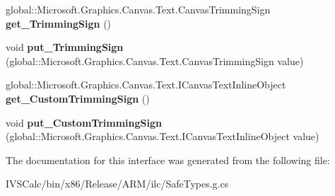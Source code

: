 \begin{DoxyCompactItemize}
\mbox{\label{interface_microsoft_1_1_graphics_1_1_canvas_1_1_text_1_1_i_canvas_text_format_a470488d4549d1bc276b39772375c8064}} 
global\+::\+Microsoft.\+Graphics.\+Canvas.\+Text.\+Canvas\+Trimming\+Sign {\bfseries get\+\_\+\+Trimming\+Sign} ()
\item 
\mbox{\label{interface_microsoft_1_1_graphics_1_1_canvas_1_1_text_1_1_i_canvas_text_format_ac8017ec2b958d4f84c22ffd8b24319e5}} 
void {\bfseries put\+\_\+\+Trimming\+Sign} (global\+::\+Microsoft.\+Graphics.\+Canvas.\+Text.\+Canvas\+Trimming\+Sign value)
\item 
\mbox{\label{interface_microsoft_1_1_graphics_1_1_canvas_1_1_text_1_1_i_canvas_text_format_a66d3e1355a4ce968e56b2239fdcd9fc5}} 
global\+::\+Microsoft.\+Graphics.\+Canvas.\+Text.\+I\+Canvas\+Text\+Inline\+Object {\bfseries get\+\_\+\+Custom\+Trimming\+Sign} ()
\item 
\mbox{\label{interface_microsoft_1_1_graphics_1_1_canvas_1_1_text_1_1_i_canvas_text_format_aefe2238d3d79706b8cfa6e70171a651c}} 
void {\bfseries put\+\_\+\+Custom\+Trimming\+Sign} (global\+::\+Microsoft.\+Graphics.\+Canvas.\+Text.\+I\+Canvas\+Text\+Inline\+Object value)
\end{DoxyCompactItemize}


The documentation for this interface was generated from the following file\+:\begin{DoxyCompactItemize}
\item 
I\+V\+S\+Calc/bin/x86/\+Release/\+A\+R\+M/ilc/Safe\+Types.\+g.\+cs\end{DoxyCompactItemize}
